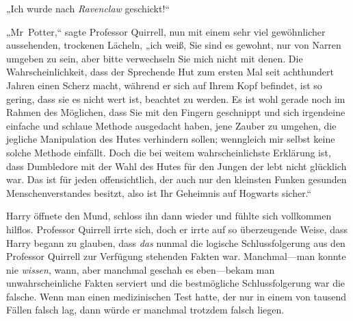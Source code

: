 „Ich wurde nach \emph{Ravenclaw} geschickt!“

„Mr~Potter,“ sagte Professor Quirrell, nun mit einem sehr viel gewöhnlicher aussehenden, trockenen Lächeln, „ich weiß, Sie sind es gewohnt, nur von Narren umgeben zu sein, aber bitte verwechseln Sie mich nicht mit denen. Die Wahrscheinlichkeit, dass der Sprechende Hut zum ersten Mal seit achthundert Jahren einen Scherz macht, während er sich auf Ihrem Kopf befindet, ist so gering, dass sie es nicht wert ist, beachtet zu werden. Es ist wohl gerade noch im Rahmen des Möglichen, dass Sie mit den Fingern geschnippt und sich irgendeine einfache und schlaue Methode ausgedacht haben, jene Zauber zu umgehen, die jegliche Manipulation des Hutes verhindern sollen; wenngleich mir selbst keine solche Methode einfällt. Doch die bei weitem wahrscheinlichste Erklärung ist, dass Dumbledore mit der Wahl des Hutes für den Jungen der lebt nicht glücklich war. Das ist für jeden offensichtlich, der auch nur den kleinsten Funken gesunden Menschenverstandes besitzt, also ist Ihr Geheimnis auf Hogwarts sicher.“

Harry öffnete den Mund, schloss ihn dann wieder und fühlte sich vollkommen hilflos. Professor Quirrell irrte sich, doch er irrte auf so überzeugende Weise, dass Harry begann zu glauben, dass \emph{das} nunmal die logische Schlussfolgerung aus den Professor Quirrell zur Verfügung stehenden Fakten war. Manchmal—man konnte nie \emph{wissen}, wann, aber manchmal geschah es eben—bekam man unwahrscheinliche Fakten serviert und die bestmögliche Schlussfolgerung war die falsche. Wenn man einen medizinischen Test hatte, der nur in einem von tausend Fällen falsch lag, dann würde er manchmal trotzdem falsch liegen.

